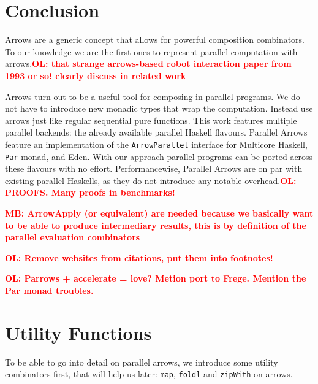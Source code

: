 \documentclass{jfp1}
\newcommand{\inlinecode}[1]{\texttt{#1}}
\newcommand{\comm}[2]{\textcolor{red}{\bfseries #1: #2}}
\newcommand{\olcomment}[1]{\comm{OL}{#1}}
\newcommand{\mbcomment}[1]{\comm{MB}{#1}}
\begin{document}
	\section{Conclusion}
\label{sec:conclusion}
Arrows are a generic concept that allows for powerful composition combinators. To our knowledge we are the first ones to represent parallel computation with arrows.\olcomment{that strange arrows-based robot interaction paper from 1993 or so! clearly discuss in related work}

Arrows turn out to be a useful tool for composing in parallel programs. We do not have to introduce new monadic types that wrap the computation. Instead use arrows just like regular sequential pure functions. 
%
This work features multiple parallel backends: the already available parallel Haskell flavours. Parallel Arrows feature an implementation of the \inlinecode{ArrowParallel} interface for Multicore Haskell, \inlinecode{Par} monad, and Eden. With our approach parallel programs can be ported across these flavours with no effort.
%
%
Performancewise, Parallel Arrows are on par with existing parallel Haskells, as they do not introduce any notable overhead.\olcomment{PROOFS. Many proofs in benchmarks!}

\mbcomment{ArrowApply (or equivalent) are needed because we basically want to be able to produce intermediary results, this is by definition of the parallel evaluation combinators}

\olcomment{Remove websites from citations, put them into footnotes!}

\olcomment{Parrows + accelerate = love? Metion port to Frege. Mention the Par monad troubles.}
        
	
        \appendix
	\section{Utility Functions}\label{utilfns}
To be able to go into detail on parallel arrows, we introduce some utility combinators first, that will help us later: \inlinecode{map}, \inlinecode{foldl} and \inlinecode{zipWith} on arrows.
\end{document}
